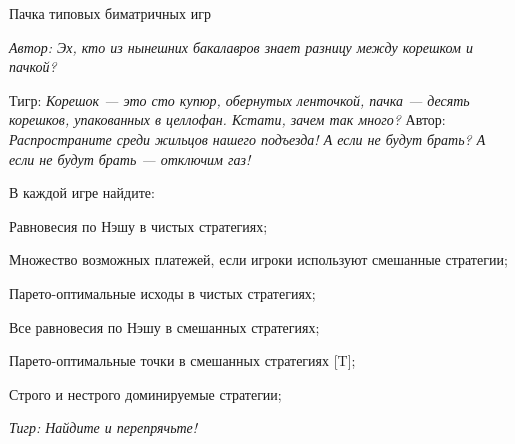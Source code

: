 \begin{problem}
 Пачка типовых биматричных игр\par
{\it Автор:  Эх, кто из нынешних бакалавров знает разницу между корешком и пачкой?}\par
Тигр: {\it Корешок --- это сто купюр, обернутых ленточкой, пачка --- десять корешков, упакованных в целлофан. Кстати, зачем так много? }
Автор: {\it Распространите среди жильцов нашего подъезда! А если не будут брать? А если не будут брать --- отключим газ!}

В каждой игре найдите: \par
Равновесия по Нэшу в чистых стратегиях;\par
Множество возможных платежей, если игроки используют смешанные стратегии;\par
Парето-оптимальные исходы в чистых стратегиях;\par
Все равновесия по Нэшу в смешанных стратегиях;\par
Парето-оптимальные точки в смешанных стратегиях [T];\par
Строго и нестрого доминируемые стратегии;\par
{\it Тигр: Найдите и перепрячьте!}\par


\end{problem}
